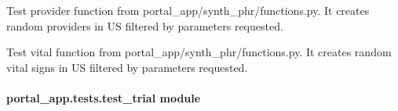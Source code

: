 \documentclass[letterpaper,10pt,english]{sphinxmanual}
\begin{document}
\begin{fulllineitems}
\begin{fulllineitems}
\label{\detokenize{CE_app.tests:CE_app.tests.test_phr.PHRTestCase.test_provider}}
\sphinxAtStartPar
Test provider function from portal\_app/synth\_phr/functions.py.
It creates random providers in US filtered by parameters requested.

\end{fulllineitems}


\begin{fulllineitems}
\label{\detokenize{CE_app.tests:CE_app.tests.test_phr.PHRTestCase.test_vital}}
\sphinxAtStartPar
Test vital function from portal\_app/synth\_phr/functions.py.
It creates random vital signs in US filtered by parameters requested.

\end{fulllineitems}


\end{fulllineitems}



\paragraph{portal\_app.tests.test\_trial module}
\label{\detokenize{CE_app.tests:module-CE_app.tests.test_trial}}\label{\detokenize{CE_app.tests:portal-app-tests-test-trial-module}}
\end{document}
